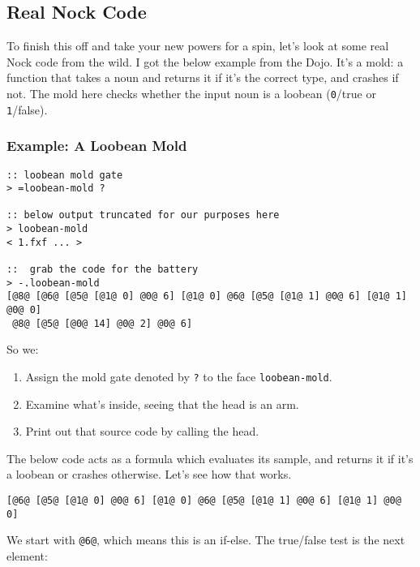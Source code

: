 \documentclass[twoside]{article}
\begin{document}
\subsection{Real Nock Code}

To finish this off and take your new powers for a spin, let's look at some real Nock code from the wild. I got the below example from the Dojo. It's a mold: a function that takes a noun and returns it if it's the correct type, and crashes if not. The mold here checks whether the input noun is a loobean (\lstinline[style=inlinecode]{0}/true or \lstinline[style=inlinecode]{1}/false).

\subsubsection{Example: A Loobean Mold}

\begin{lstlisting}[style=listingcode]
:: loobean mold gate
> =loobean-mold ?

:: below output truncated for our purposes here
> loobean-mold
< 1.fxf ... >

::  grab the code for the battery
> -.loobean-mold
[@8@ [@6@ [@5@ [@1@ 0] @0@ 6] [@1@ 0] @6@ [@5@ [@1@ 1] @0@ 6] [@1@ 1] @0@ 0]
 @8@ [@5@ [@0@ 14] @0@ 2] @0@ 6]
\end{lstlisting}

\noindent
So we:

\begin{enumerate}
  \item  Assign the mold gate denoted by \lstinline[style=inlinecode]{?} to the face \lstinline[style=inlinecode]{loobean-mold}.
  \item  Examine what's inside, seeing that the head is an arm.
  \item  Print out that source code by calling the head.
\end{enumerate}

\noindent
The below code acts as a formula which evaluates its sample, and returns it if it's a loobean or crashes otherwise. Let's see how that works.

\begin{lstlisting}[style=listingblock]
[@6@ [@5@ [@1@ 0] @0@ 6] [@1@ 0] @6@ [@5@ [@1@ 1] @0@ 6] [@1@ 1] @0@ 0]
\end{lstlisting}

\noindent
We start with \lstinline[style=inlinecode]{@6@}, which means this is an if-else. The true/false test is the next element:
\end{document}
